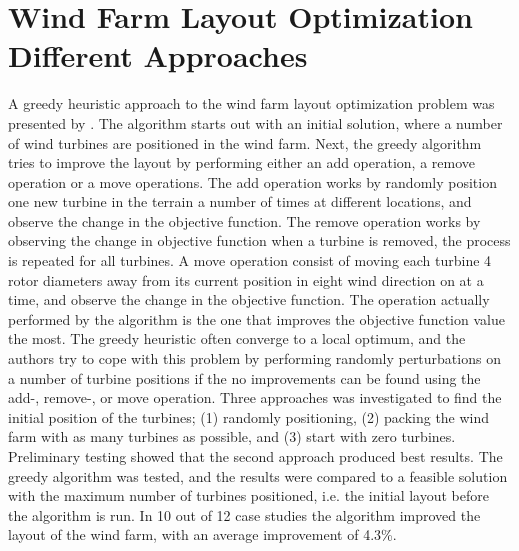 \section{Wind Farm Layout Optimization Different Approaches}


A greedy heuristic approach to the wind farm layout optimization problem was presented by \cite{Ozturk}. The algorithm starts out with an initial solution, where a number of wind turbines are positioned in the wind farm. Next, the greedy algorithm tries to improve the layout by performing either an add operation, a remove operation or a move operations. The add operation works by randomly position one new turbine in the terrain a number of times at different locations, and observe the change in the objective function. The remove operation works by observing the change in objective function when a turbine is removed, the process is repeated for all turbines. A move operation consist of moving each turbine 4 rotor diameters away from its current position in eight wind direction on at a time, and observe the change in the objective function. The operation actually performed by the algorithm is the one that improves the objective function value the most. The greedy heuristic often converge to a local optimum, and the authors try to cope with this problem by performing randomly perturbations on a number of turbine positions if the no improvements can be found using the add-, remove-, or move operation. Three approaches was investigated to find the initial position of the turbines; (1) randomly positioning, (2) packing the wind farm with as many turbines as possible, and (3) start with zero turbines. Preliminary testing showed that the second approach produced best results. The greedy algorithm was tested, and the results were compared to a feasible solution with the maximum number of turbines positioned, i.e. the initial layout before the algorithm is run. In 10 out of 12 case studies the algorithm improved the layout of the wind farm, with an average improvement of 4.3\%. \\


